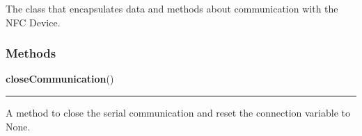     \label{NFC_Device:NFC_Device}
The class that encapsulates data and methods about communication with the 
NFC Device.



  \subsubsection{Methods}

    \label{NFC_Device:NFC_Device:closeCommunication}

    \vspace{0.5ex}

\hspace{.8\funcindent}\begin{boxedminipage}{\funcwidth}

    \raggedright \textbf{closeCommunication}()

    \vspace{-1.5ex}

    \rule{\textwidth}{0.5\fboxrule}
\setlength{\parskip}{2ex}
    A method to close the serial communication and reset the connection 
    variable to None.

\setlength{\parskip}{1ex}
    \end{boxedminipage}

    \label{NFC_Device:NFC_Device:setCommunicationTimer}

    \vspace{0.5ex}


